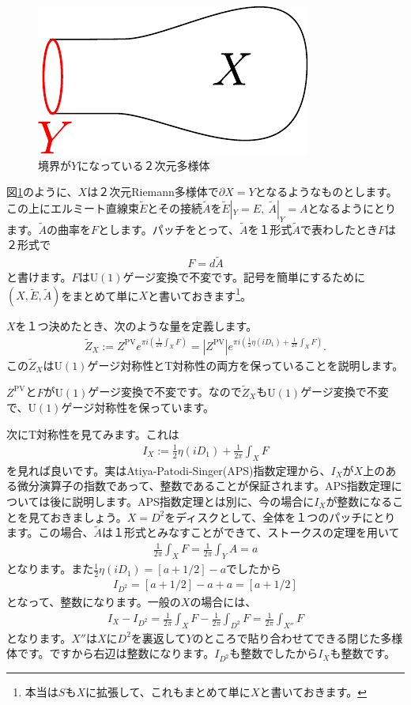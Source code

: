 \documentclass[paper=a4, fontsize=12pt, line_length=16cm, number_of_lines=33,dvipdfmx]{jlreq}
\numberwithin{equation}{section}
\newcommand{\del}{\partial}
\newcommand{\U}{\mathrm{U}}
\newcommand{\ZPV}{Z^{\mathrm{PV}}}
\newcommand{\Et}{\widetilde{E}}
\newcommand{\At}{\widetilde{A}}
\newcommand{\Zt}{\widetilde{Z}}
\begin{document}
\begin{figure}[htbp]
  \centering
  \includegraphics{inflow.pdf}
  \caption{境界が$Y$になっている２次元多様体}
  \label{fig:inflow}
\end{figure}
図\ref{fig:inflow}のように、$X$は２次元Riemann多様体で$\del X=Y$となるようなものとします。この上にエルミート直線束$\Et$とその接続$\At$を$\Et|_{Y}=E,\ \At|_{Y}=A$となるようにとります。$\At$の曲率を$F$とします。パッチをとって、$\At$を１形式$\At$で表わしたとき$F$は２形式で
\begin{align}
  F=d\At
\end{align}
と書けます。$F$は$\U(1)$ゲージ変換で不変です。記号を簡単にするために$(X,\Et,\At)$をまとめて単に$X$と書いておきます\footnote{本当は$S$も$X$に拡張して、これもまとめて単に$X$と書いておきます。}。

$X$を１つ決めたとき、次のような量を定義します。
\begin{align}
  \Zt_{X}:=\ZPV e^{\pi i(\frac{1}{2\pi}\int_{X}F)}
  =|\ZPV|e^{\pi i(\frac{1}{2}\eta(iD_1)+\frac{1}{2\pi}\int_{X}F)}.\label{2dpartitionfunctionwithboundary}
\end{align}
この$\Zt_{X}$は$\U(1)$ゲージ対称性とT対称性の両方を保っていることを説明します。

$\ZPV$と$F$が$\U(1)$ゲージ変換で不変です。なので$\Zt_{X}$も$\U(1)$ゲージ変換で不変で、$\U(1)$ゲージ対称性を保っています。

次にT対称性を見てみます。これは
\begin{align}
  I_{X}:=\frac{1}{2}\eta(iD_1)+\frac{1}{2\pi}\int_{X}F
\end{align}
を見れば良いです。実はAtiya-Patodi-Singer(APS)指数定理から、$I_{X}$が$X$上のある微分演算子の指数であって、整数であることが保証されます。APS指数定理については後に説明します。APS指数定理とは別に、今の場合に$I_{X}$が整数になることを見ておきましょう。$X=D^2$をディスクとして、全体を１つのパッチにとります。この場合、$\At$は１形式とみなすことができて、ストークスの定理を用いて
\begin{align}
  \frac{1}{2\pi}\int_{X} F=\frac{1}{2\pi}\int_{Y}A=a
\end{align}
となります。また$\frac12 \eta(iD_1)=[a+1/2]-a$でしたから
\begin{align}
  I_{D^2}=[a+1/2]-a+a=[a+1/2]
\end{align}
となって、整数になります。一般の$X$の場合には、
\begin{align}
  I_{X}-I_{D^2}=\frac{1}{2\pi} \int_X F-\frac{1}{2\pi} \int_{D^2} F=\frac{1}{2\pi} \int_{X''}F
\end{align}
となります。$X''$は$X$に$D^2$を裏返して$Y$のところで貼り合わせてできる閉じた多様体です。ですから右辺は整数になります。$I_{D^2}$も整数でしたから$I_{X}$も整数です。
\end{document}
